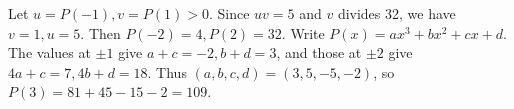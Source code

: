 Let $u=P(-1),v=P(1)>0$. Since $uv=5$ and $v$ divides 32, we have $v=1,u=5$. Then $P(-2)=4,P(2)=32$. Write $P(x)=ax^3+bx^2+cx+d$. The values at $\pm1$ give $a+c=-2,b+d=3$, and those at $\pm2$ give $4a+c=7,4b+d=18$. Thus $(a,b,c,d)=(3,5,-5,-2)$, so $P(3)=81+45-15-2=\boxed{109}$.
